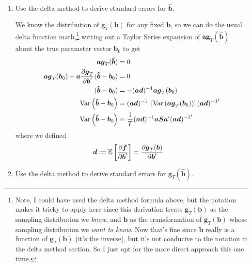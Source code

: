 \documentclass[12pt]{article}
\theoremstyle{plain}
\theoremstyle{definition}
\theoremstyle{remark}
\newcommand{\bsb}{\boldsymbol{b}}
\newcommand{\bshatb}{\boldsymbol{\hat{b}}}
\newcommand{\bsd}{\boldsymbol{d}}
\newcommand{\bsg}{\boldsymbol{g}}
\newcommand{\bsS}{\boldsymbol{S}}
\begin{document}
\begin{enumerate}
  \item Use the delta method to derive standard errors for
    $\bshatb$.

    We know the distribution of $\bsg_T(\bsb)$
    for any fixed $\bsb$,
    so we can do the usual delta function math,\footnote{%
    Note, I could have used the delta method formula above, but the
    notation makes it
    tricky to apply here since this derivation treats
    $\bsg_T(\bsb)$ as the sampling distribution we
    \emph{know}, and $\bsb$ as the transformation of
    $\bsg_T(\bsb)$ whose sampling distribution we
    \emph{want to know}.  Now that's fine since $\bsb$ really
    is a function of $\bsg_T(\bsb)$ (it's the
    inverse), but it's not conducive to the notation in the delta method
    section. So I just opt for the more direct approach this one time.%
    }
    writing out a Taylor Series expansion of $\boldsymbol{a}
    \bsg_T(\bshatb)$ about the true parameter
    vector $\bsb_0$ to get
    \begin{align}
      \boldsymbol{a} \bsg_T(\bshatb)
      &= 0\notag\\
      \boldsymbol{a} \bsg_T(\bsb_0)
      + \boldsymbol{a}
      \frac{\partial \bsg_T}{\partial \bsb'}
      (\bshatb-\bsb_0)
      &= 0\notag\\
      (\bshatb-\bsb_0)
      &=
      -(\boldsymbol{a} \bsd)^{-1}
      \boldsymbol{a} \bsg_T(\bsb_0)
      \label{eq:bhat_b0}\\
      \text{Var}\left(\bshatb-\bsb_0\right)
      &=
      (\boldsymbol{a} \bsd)^{-1}
      \; \left[\text{Var}\left(
        \boldsymbol{a} \bsg_T(\bsb_0)
      \right)
      \right]
      {(\boldsymbol{a} \bsd)^{-1}}'\notag\\
      \text{Var}\left(\bshatb-\bsb_0\right)
      &=
      \frac{1}{T}
      (\boldsymbol{a} \bsd)^{-1}
      \boldsymbol{a} \bsS \boldsymbol{a}'
      {(\boldsymbol{a} \bsd)^{-1}}'\notag
    \end{align}
    where we defined
    \begin{align*}
      \bsd &:=
      \mathbb{E}\left[
        \frac{\partial \boldsymbol{f}}{\partial \bsb'}
      \right]
      =
      \frac{\partial \bsg_T(\bsb)}{%
        \partial \bsb'}
    \end{align*}

  \item Use the delta method to derive standard errors for
    $\bsg_T(\bshatb)$.


\end{enumerate}
\end{document}
